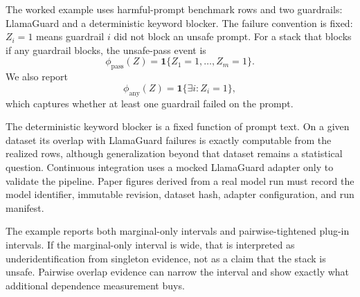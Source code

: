 The worked example uses harmful-prompt benchmark rows and two guardrails:
LlamaGuard and a deterministic keyword blocker. The failure convention is
fixed: $Z_i=1$ means guardrail $i$ did not block an unsafe prompt. For a stack
that blocks if any guardrail blocks, the unsafe-pass event is
\[
  \phi_{\mathrm{pass}}(Z) = \mathbf{1}\{Z_1=1,\ldots,Z_m=1\}.
\]
We also report
\[
  \phi_{\mathrm{any}}(Z) = \mathbf{1}\{\exists i: Z_i=1\},
\]
which captures whether at least one guardrail failed on the prompt.

The deterministic keyword blocker is a fixed function of prompt text. On a
given dataset its overlap with LlamaGuard failures is exactly computable from
the realized rows, although generalization beyond that dataset remains a
statistical question. Continuous integration uses a mocked LlamaGuard adapter
only to validate the pipeline. Paper figures derived from a real model run must
record the model identifier, immutable revision, dataset hash, adapter
configuration, and run manifest.

The example reports both marginal-only intervals and pairwise-tightened
plug-in intervals. If the marginal-only interval is wide, that is interpreted
as underidentification from singleton evidence, not as a claim that the stack is
unsafe. Pairwise overlap evidence can narrow the interval and show exactly what
additional dependence measurement buys.
